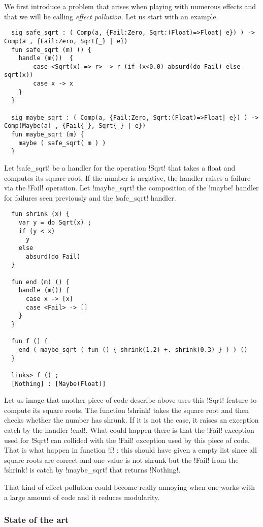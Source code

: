 \documentclass[11pt, nonacm=true, language=french, language=english]{acmart}
\begin{document}
We first introduce a problem that arises when playing with numerous effects and that we will be calling \emph{effect pollution}. Let us start with an example.

\begin{lstlisting}
  sig safe_sqrt : ( Comp(a, {Fail:Zero, Sqrt:(Float)=>Float| e}) ) -> Comp(a , {Fail:Zero, Sqrt{_} | e})
  fun safe_sqrt (m) () {
    handle (m())  {
        case <Sqrt(x) => r> -> r (if (x<0.0) absurd(do Fail) else sqrt(x))
        case x -> x
    }
  }

  sig maybe_sqrt : ( Comp(a, {Fail:Zero, Sqrt:(Float)=>Float| e}) ) -> Comp(Maybe(a) , {Fail{_}, Sqrt{_} | e})
  fun maybe_sqrt (m) {
    maybe ( safe_sqrt( m ) )
  }
\end{lstlisting}

Let !safe_sqrt! be a handler for the operation !Sqrt! that takes a float and computes its square root. If the number is negative, the handler raises a failure via the !Fail! operation. Let !maybe_sqrt! the composition of the !maybe! handler for failures seen previously and the !safe_sqrt! handler.
\begin{lstlisting}
  fun shrink (x) {
    var y = do Sqrt(x) ;
    if (y < x)
      y
    else
      absurd(do Fail)
  }

  fun end (m) () {
    handle (m()) {
      case x -> [x]
      case <Fail> -> []
    }
  }

  fun f () {
    end ( maybe_sqrt ( fun () { shrink(1.2) +. shrink(0.3) } ) ) ()
  }

  links> f () ;
  [Nothing] : [Maybe(Float)]
\end{lstlisting}

Let us image that another piece of code describe above uses this !Sqrt! feature to compute its square roots. The function !shrink! takes the square root and then checks whether the number has shrunk. If it is not the case, it raises an exception catch by the handler !end!. What could happen there is that the !Fail! exception used for !Sqrt! can collided with the !Fail! exception used by this piece of code. That is what happen in function !f! : this should have given a empty list since all square roots are correct and one value is not shrunk but the !Fail! from the !shrink! is catch by !maybe_sqrt! that returns !Nothing!.

That kind of effect pollution could become really annoying when one works with a large amount of code and it reduces modularity.

\subsubsection{State of the art}
\label{sec:state-art}
\end{document}
